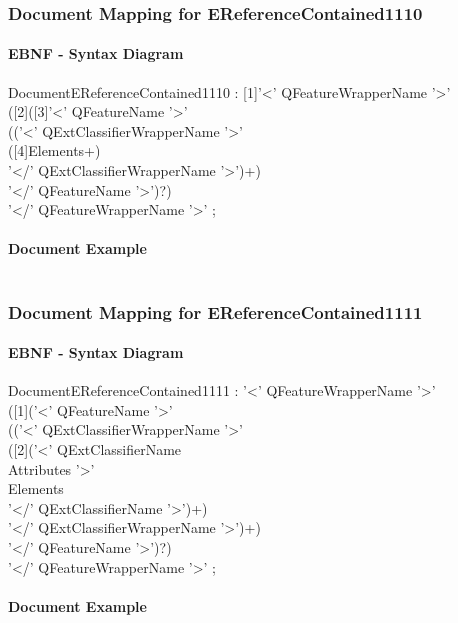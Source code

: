 \documentclass[11pt,a4paper]{article}
\begin{document}
\subsubsection{Document Mapping for EReferenceContained1110}
\paragraph{EBNF - Syntax Diagram}
\begin{rail}
DocumentEReferenceContained1110 : [1]'<' QFeatureWrapperName '>' \\
([2]([3]'<' QFeatureName '>' \\
(('<' QExtClassifierWrapperName  '>' \\
([4]Elements+) \\
'</' QExtClassifierWrapperName  '>')+)\\
 '</' QFeatureName '>')?) \\
'</' QFeatureWrapperName '>' ;
\end{rail}
\paragraph{Document Example}
\inputminted[fontsize=\footnotesize]{xml}{examples/EReferenceContained1110.xml}

\subsubsection{Document Mapping for EReferenceContained1111}
\paragraph{EBNF - Syntax Diagram}
\begin{rail}
DocumentEReferenceContained1111 : '<' QFeatureWrapperName '>' \\
([1]('<' QFeatureName '>' \\
(('<' QExtClassifierWrapperName  '>' \\
([2]('<' QExtClassifierName  \\ Attributes '>' \\
Elements \\
'</' QExtClassifierName  '>')+) \\
'</' QExtClassifierWrapperName  '>')+) \\
'</' QFeatureName '>')?) \\
'</' QFeatureWrapperName '>' ;
\end{rail}

\paragraph{Document Example}
\inputminted[fontsize=\footnotesize]{xml}{examples/EReferenceContained1111.xml}
\end{document}
